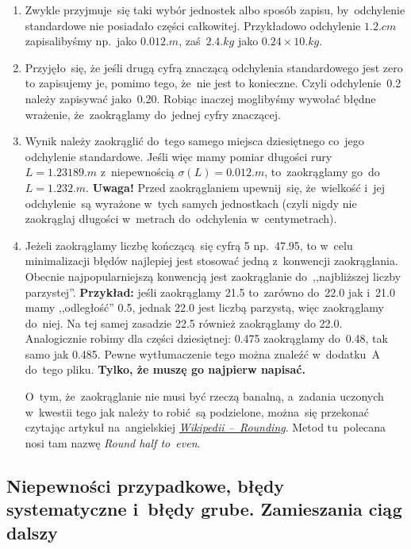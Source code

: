\documentclass[a4paper,11pt]{article}
\newcommand{\tb}{\textbf}
\begin{document}
\begin{enumerate}
\item Zwykle przyjmuje~się taki wybór jednostek albo sposób zapisu,
  by~odchylenie standardowe nie posiadało części całkowitej.
  Przykładowo odchylenie $1.2 \si{.cm}$ zapisalibyśmy np.~jako
  $0.012 \si{.m}$, zaś~$2.4 \si{.kg}$ jako $0.24 \times 10 \si{.kg}$.

\item Przyjęło~się, że jeśli drugą cyfrą znaczącą odchylenia
  standardowego jest zero to zapisujemy je, pomimo tego, że~nie jest
  to konieczne. Czyli odchylenie~0.2 należy zapisywać jako~0.20.
  Robiąc inaczej moglibyśmy wywołać błędne wrażenie, że~zaokrąglamy
  do~jednej cyfry znaczącej.

\item Wynik należy zaokrąglić do~tego samego miejsca dziesiętnego
  co~jego odchylenie standardowe. Jeśli więc mamy pomiar długości rury
  $L = 1.23189 \si{.m}$ z~niepewnością $\sigma( L ) = 0.012 \si{.m}$,
  to~zaokrąglamy go~do~$L = 1.232 \si{.m}$. \tb{Uwaga!} Przed
  zaokrąglaniem upewnij~się, że~wielkość i~jej odchylenie~są wyrażone
  w~tych samych jednostkach (czyli nigdy nie zaokrąglaj długości
  w~metrach do~odchylenia w~centymetrach).

\item Jeżeli zaokrąglamy liczbę kończącą~się cyfrą 5 np.~47.95, to
  w~celu minimalizacji błędów najlepiej jest stosować jedną
  z~konwencji zaokrąglania. Obecnie najpopularniejszą konwencją jest
  zaokrąglanie do~,,najbliższej liczby parzystej''. \tb{Przykład:}
  jeśli zaokrąglamy 21.5 to~zarówno do~22.0 jak i~21.0 mamy
  ,,odległość'' 0.5, jednak 22.0 jest liczbą parzystą, więc
  zaokrąglamy do~niej. Na tej samej zasadzie 22.5 również zaokrąglamy
  do 22.0. Analogicznie robimy dla części dziesiętnej: 0.475
  zaokrąglamy do~0.48, tak samo jak 0.485. Pewne wytłumaczenie tego
  można znaleźć w~dodatku~A do~tego pliku. \tb{Tylko, że muszę go
    najpierw napisać.}

  O~tym, że~zaokrąglanie nie musi być rzeczą banalną, a~zadania
  uczonych w~kwestii tego jak należy to robić~są podzielone, można~się
  przekonać czytając artykuł na~angielskiej
  \href{https://en.wikipedia.org/wiki/Rounding}{\emph{Wikipedii
    --~Rounding}}. Metod tu~polecana nosi tam nazwę \emph{Round half
    to~even}.
\end{enumerate}





\subsection{Niepewności przypadkowe, błędy systematyczne i~błędy
  grube. Zamieszania ciąg dalszy}
\label{sec:niepewnosci}
\end{document}
